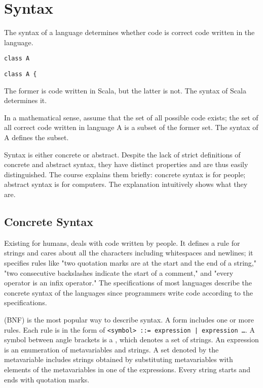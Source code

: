 \section{Syntax}

The syntax of a language determines whether code is correct code written in the
language.

\begin{verbatim}
class A
\end{verbatim}

\begin{verbatim}
class A {
\end{verbatim}

The former is code written in Scala, but the latter is not. The syntax of Scala
determines it.

In a mathematical sense, assume that the set of all possible code exists; the set
of all correct code written in language A is a subset of the former set. The
syntax of A defines the subset.

Syntax is either concrete or abstract. Despite the lack of strict definitions of
concrete and abstract syntax, they have distinct properties and are thus easily
distinguished. The course explains them briefly: concrete syntax is for people;
abstract syntax is for computers. The explanation intuitively shows what they
are.

\subsection{Concrete Syntax}

Existing for humans,  deals with code written by people. It
defines a rule for strings and cares about all the characters including
whitespaces and newlines; it specifies rules like "two quotation marks are at the
start and the end of a string," "two consecutive backslashes indicate the start
of a comment," and "every operator is an infix operator." The specifications of
most languages describe the concrete syntax of the languages since programmers
write code according to the specifications.

 (BNF) is the most popular way to describe syntax. A form
includes one or more rules. Each rule is in the form of
\verb!<symbol> ::= expression | expression …!. A symbol between angle brackets is a
, which denotes a set of strings. An expression is an
enumeration of metavariables and strings. A set denoted by the metavariable
includes strings obtained by substituting metavariables with elements of the
metavariables in one of the expressions. Every string starts and ends with
quotation marks.

